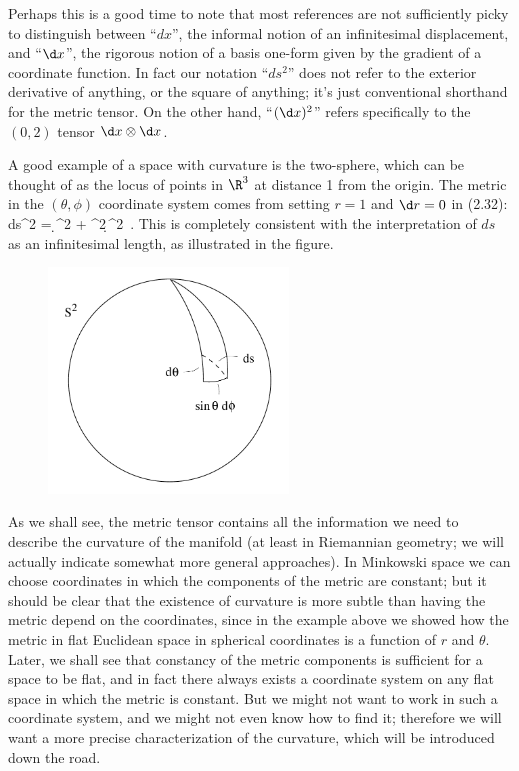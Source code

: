\documentclass[12pt]{article}
\begin{document}
Perhaps this is a good time to note that most references are not
sufficiently picky to distinguish between
``$dx$'', the informal notion of an infinitesimal displacement, and
``$\d x$'', the rigorous notion of a basis one-form given by the
gradient of a coordinate function.  In fact our notation ``$ds^2$''
does not refer to the exterior derivative of anything, or the square
of anything; it's just conventional shorthand for the metric tensor.
On the other hand, ``$(\d x)^2$'' refers specifically to the $(0,2)$
tensor $\d x\otimes\d x$.

A good example of a
space with curvature is the two-sphere, which can be thought of
as the locus of points in $\R^3$ at distance 1 from the origin.  The 
metric in the $(\theta, \phi)$ coordinate system comes from setting $r=1$
and $\d r=0$ in (2.32):
\be
  ds^2 = \d\theta^2 + \sin^2\theta\,\d \phi^2\ .\label{2.33}
\ee
This is completely consistent with the interpretation of $ds$ as an
infinitesimal length, as illustrated in the figure.

\begin{figure}
  \centerline{
  \includegraphics[height=6cm]{pdf/two18}}
\end{figure}

As we shall see, the metric tensor contains all the information we need
to describe the curvature of the manifold (at least in Riemannian
geometry; we will actually indicate somewhat more general approaches).
In Minkowski space we can choose coordinates in which the components of
the metric are constant; but it should be clear that the existence of 
curvature is more subtle than having the metric depend on the coordinates,
since in the example above we showed how the metric in flat Euclidean
space in spherical coordinates is a function of $r$ and $\theta$.  Later,
we shall see that constancy of the metric components is sufficient
for a space to be flat, and in fact there always exists a coordinate 
system on any flat space in which the metric is constant.  But we might
not want to work in such a coordinate system, and we might not even 
know how to find it; therefore we will want a more precise characterization
of the curvature, which will be introduced down the road.
\end{document}
